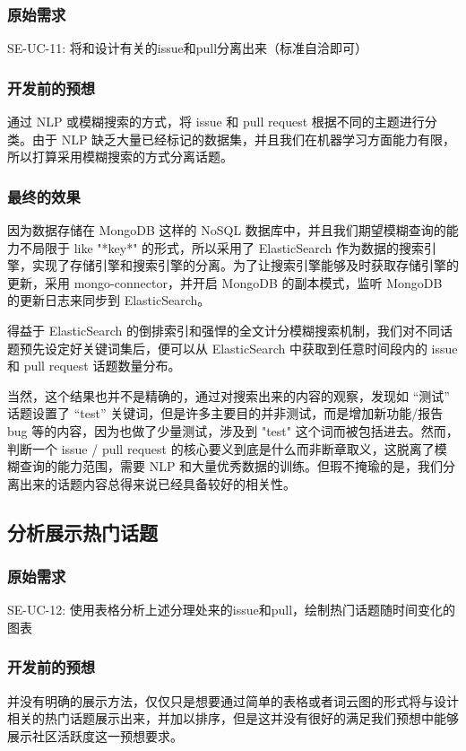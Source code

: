 \documentclass[a4paper,20pt]{article}
\begin{document}
\subsubsection{原始需求}
SE-UC-11: 将和设计有关的issue和pull分离出来（标准⾃洽即可）\par
\subsubsection{开发前的预想}
通过 NLP 或模糊搜索的方式，将 issue 和 pull request 根据不同的主题进行分类。由于 NLP 缺乏大量已经标记的数据集，并且我们在机器学习方面能力有限，所以打算采用模糊搜索的方式分离话题。
\subsubsection{最终的效果}
因为数据存储在 MongoDB 这样的 NoSQL 数据库中，并且我们期望模糊查询的能力不局限于 like "*key*" 的形式，所以采用了 ElasticSearch 作为数据的搜索引擎，实现了存储引擎和搜索引擎的分离。为了让搜索引擎能够及时获取存储引擎的更新，采用 mongo-connector，并开启 MongoDB 的副本模式，监听 MongoDB 的更新日志来同步到 ElasticSearch。\par
得益于 ElasticSearch 的倒排索引和强悍的全文计分模糊搜索机制，我们对不同话题预先设定好关键词集后，便可以从 ElasticSearch 中获取到任意时间段内的 issue 和 pull request 话题数量分布。\par
当然，这个结果也并不是精确的，通过对搜索出来的内容的观察，发现如 “测试” 话题设置了 “test” 关键词，但是许多主要目的并非测试，而是增加新功能/报告 bug 等的内容，因为也做了少量测试，涉及到 "test" 这个词而被包括进去。然而，判断一个 issue / pull request 的核心要义到底是什么而非断章取义，这脱离了模糊查询的能力范围，需要 NLP 和大量优秀数据的训练。但瑕不掩瑜的是，我们分离出来的话题内容总得来说已经具备较好的相关性。
\subsection{分析展示热门话题}
\subsubsection{原始需求}
SE-UC-12: 使⽤表格分析上述分理处来的issue和pull，绘制热⻔话题随时间变化的
图表\par
\subsubsection{开发前的预想}
并没有明确的展示方法，仅仅只是想要通过简单的表格或者词云图的形式将与设计相关的热门话题展示出来，并加以排序，但是这并没有很好的满足我们预想中能够展示社区活跃度这一预想要求。
\end{document}
